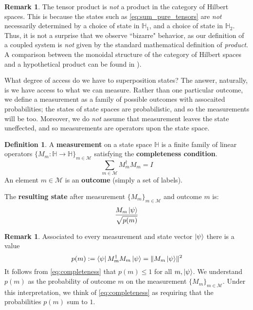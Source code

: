 \documentclass[12pt]{article}
\theoremstyle{plain}
\theoremstyle{definition}
\newtheorem{defn}[thm]{Definition} %
\newtheorem{remark}[thm]{Remark}
\newcommand{\bb}[1]{\mathbb{#1}}
\newcommand{\call}[1]{\mathcal{#1}}
\newcommand{\lto}{\longrightarrow}
\begin{document}
	\begin{remark}
		The tensor product is \emph{not} a product in the category of Hilbert spaces. This is because the states such as \eqref{eq:sum_pure_tensors} are \emph{not} necessarily determined by a choice of state in $\bb{H}_1$, and a choice of state in $\bb{H}_2$. Thus, it is not a surprise that we observe ``bizarre" behavior, as our definition of a coupled system is \emph{not} given by the standard mathematical definition of \emph{product}. A comparison between the monoidal structure of the category of Hilbert spaces and a hypothetical product can be found in \cite{Baez}).
	\end{remark}
What degree of access do we have to superposition states? The answer, naturally, is we have access to what we can measure. Rather than one particular outcome, we define a measurement as a family of possible outcomes with assocaited probabilities; the states of state spaces are probabilistic, and so the measurements will be too. Moreover, we do \emph{not} assume that measurement leaves the state uneffected, and so measurements are operators upon the state space.

\begin{defn}\label{def:measurement}
	A \textbf{measurement} on a state space $\bb{H}$ is a finite family of linear operators $\lbrace M_m: \bb{H}\lto \bb{H}\rbrace_{m \in \call{M}}$ satisfying the \textbf{completeness condition}.
	\begin{equation}\label{eq:completeness}
		\sum_{m \in \call{M}}M_m^{\dagger}M_m = I
	\end{equation}
	An element $m \in \call{M}$ is an \textbf{outcome} (simply a set of labels).
	
	The \textbf{resulting state} after measurement $\{ M_m \}_{m \in \call{M}}$ and outcome $m$ is:
	\begin{equation}
		\frac{M_m\ket{\psi}}{\sqrt{p(m)}}
	\end{equation}
\end{defn}
\begin{remark}
	Associated to every measurement and state vector $\ket{\psi}$ there is a value
	\begin{equation}
		p(m) := \bra{\psi}M^{\dagger}_mM_m\ket{\psi} = \lVert M_m \ket{\psi} \rVert^2
	\end{equation}
	It follows from \eqref{eq:completeness} that $p(m) \leq 1$ for all $m, \ket{\psi}$. We understand $p(m)$ as the probability of outcome $m$ on the measurement $\{ M_m \}_{m \in \call{M}}$. Under this interpretation, we think of \eqref{eq:completeness} as requiring that the probabilities $p(m)$ sum to $1$.
	\end{remark}
	
\end{document}
